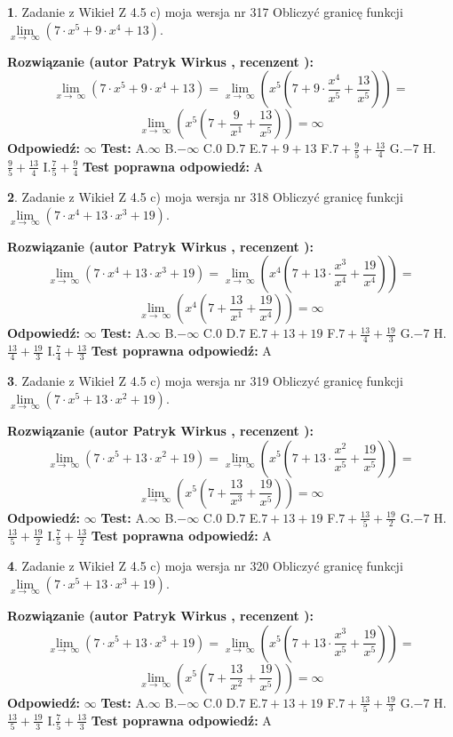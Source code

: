 \documentclass[12pt, a4paper]{article}
\theoremstyle{definition} %
\newtheorem{zad}{}
\newcommand{\zadStart}[1]{\begin{zad}#1\newline}
\newcommand{\zadStop}{\end{zad}}
\newcommand{\rozwStart}[2]{\noindent \textbf{Rozwiązanie (autor #1 , recenzent #2): }\newline}
\newcommand{\rozwStop}{\newline}
\newcommand{\odpStart}{\noindent \textbf{Odpowiedź:}\newline}
\newcommand{\odpStop}{\newline}
\newcommand{\testStart}{\noindent \textbf{Test:}\newline}
\newcommand{\testStop}{\newline}
\newcommand{\kluczStart}{\noindent \textbf{Test poprawna odpowiedź:}\newline}
\newcommand{\kluczStop}{\newline}
\begin{document}
\zadStart{Zadanie z Wikieł Z 4.5 c) moja wersja nr 317}
Obliczyć granicę funkcji  $\lim\limits_{x\to\ \infty}(7 \cdot x^{5}+9 \cdot x^{4}+13)$.
\zadStop
\rozwStart{Patryk Wirkus}{}
$$\lim\limits_{x\to\ \infty}(7 \cdot x^{5}+9 \cdot x^{4}+13) = \lim\limits_{x\to\ \infty}(x^{5}(7 +9 \cdot \frac{x^{4}}{x^{5}}+\frac{13}{x^{5}})) =$$ $$\lim\limits_{x\to\ \infty}(x^{5}(7 +\frac{9}{x^{1}}+\frac{13}{x^{5}})) =\infty$$
\rozwStop
\odpStart
$\infty$
\odpStop
\testStart
A.$\infty$ B.$-\infty$ C.$0$ D.$7$ E.$7 + 9 + 13$
F.$7+\frac{9}{5}+\frac{13}{4}$ G.$-7$
H.$\frac{9}{5}+\frac{13}{4}$
I.$\frac{7}{5}+\frac{9}{4}$
\testStop
\kluczStart
A
\kluczStop



\zadStart{Zadanie z Wikieł Z 4.5 c) moja wersja nr 318}
Obliczyć granicę funkcji  $\lim\limits_{x\to\ \infty}(7 \cdot x^{4}+13 \cdot x^{3}+19)$.
\zadStop
\rozwStart{Patryk Wirkus}{}
$$\lim\limits_{x\to\ \infty}(7 \cdot x^{4}+13 \cdot x^{3}+19) = \lim\limits_{x\to\ \infty}(x^{4}(7 +13 \cdot \frac{x^{3}}{x^{4}}+\frac{19}{x^{4}})) =$$ $$\lim\limits_{x\to\ \infty}(x^{4}(7 +\frac{13}{x^{1}}+\frac{19}{x^{4}})) =\infty$$
\rozwStop
\odpStart
$\infty$
\odpStop
\testStart
A.$\infty$ B.$-\infty$ C.$0$ D.$7$ E.$7 + 13 + 19$
F.$7+\frac{13}{4}+\frac{19}{3}$ G.$-7$
H.$\frac{13}{4}+\frac{19}{3}$
I.$\frac{7}{4}+\frac{13}{3}$
\testStop
\kluczStart
A
\kluczStop



\zadStart{Zadanie z Wikieł Z 4.5 c) moja wersja nr 319}
Obliczyć granicę funkcji  $\lim\limits_{x\to\ \infty}(7 \cdot x^{5}+13 \cdot x^{2}+19)$.
\zadStop
\rozwStart{Patryk Wirkus}{}
$$\lim\limits_{x\to\ \infty}(7 \cdot x^{5}+13 \cdot x^{2}+19) = \lim\limits_{x\to\ \infty}(x^{5}(7 +13 \cdot \frac{x^{2}}{x^{5}}+\frac{19}{x^{5}})) =$$ $$\lim\limits_{x\to\ \infty}(x^{5}(7 +\frac{13}{x^{3}}+\frac{19}{x^{5}})) =\infty$$
\rozwStop
\odpStart
$\infty$
\odpStop
\testStart
A.$\infty$ B.$-\infty$ C.$0$ D.$7$ E.$7 + 13 + 19$
F.$7+\frac{13}{5}+\frac{19}{2}$ G.$-7$
H.$\frac{13}{5}+\frac{19}{2}$
I.$\frac{7}{5}+\frac{13}{2}$
\testStop
\kluczStart
A
\kluczStop



\zadStart{Zadanie z Wikieł Z 4.5 c) moja wersja nr 320}
Obliczyć granicę funkcji  $\lim\limits_{x\to\ \infty}(7 \cdot x^{5}+13 \cdot x^{3}+19)$.
\zadStop
\rozwStart{Patryk Wirkus}{}
$$\lim\limits_{x\to\ \infty}(7 \cdot x^{5}+13 \cdot x^{3}+19) = \lim\limits_{x\to\ \infty}(x^{5}(7 +13 \cdot \frac{x^{3}}{x^{5}}+\frac{19}{x^{5}})) =$$ $$\lim\limits_{x\to\ \infty}(x^{5}(7 +\frac{13}{x^{2}}+\frac{19}{x^{5}})) =\infty$$
\rozwStop
\odpStart
$\infty$
\odpStop
\testStart
A.$\infty$ B.$-\infty$ C.$0$ D.$7$ E.$7 + 13 + 19$
F.$7+\frac{13}{5}+\frac{19}{3}$ G.$-7$
H.$\frac{13}{5}+\frac{19}{3}$
I.$\frac{7}{5}+\frac{13}{3}$
\testStop
\kluczStart
A
\kluczStop
\end{document}
